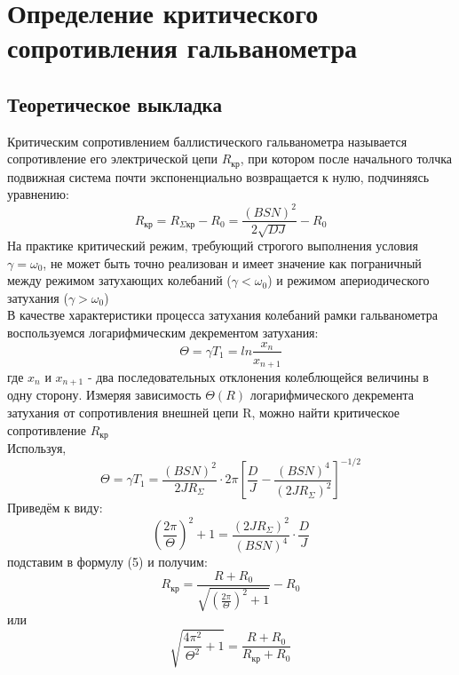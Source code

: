 \documentclass[a4paper,12pt]{article} %
\begin{document}
\section{Определение критического сопротивления гальванометра}
\subsection{Теоретическое выкладка}
Критическим сопротивлением баллистического гальванометра называется сопротивление его электрической цепи $R_\text{кр}$, при котором после начального толчка подвижная система почти экспоненциально возвращается к нулю, подчиняясь уравнению:
\begin{equation}
R_\text{кр} = R_{\Sigma\text{кр}} - R_0 = \frac{(BSN)^2}{2 \sqrt{DJ}} - R_0   
\end{equation}
На практике критический режим, требующий строгого выполнения условия $\gamma = \omega_0$, не может быть точно реализован и имеет значение как пограничный между режимом затухающих колебаний ($\gamma < \omega_0$) и режимом апериодического затухания ($\gamma > \omega_0$)
\\
В качестве характеристики процесса затухания колебаний рамки гальванометра воспользуемся логарифмическим декрементом затухания:
\begin{equation}
    \Theta = \gamma T_1 = ln\frac{x_n}{x_{n+1}}
\end{equation}
где $x_n$ и $x_{n+1}$ - два последовательных отклонения колеблющейся величины в одну сторону. Измеряя зависимость $\Theta(R)$ логарифмического декремента затухания от сопротивления внешней цепи R, можно найти 
критическое сопротивление $R_\text{кр}$
\\
Используя,
\[
\Theta = \gamma T_1 = \frac{(BSN)^2}{2 J R_\Sigma} \cdot 2\pi \left[ \frac{D}{J} - \frac{(BSN)^4}{(2JR_\Sigma)^2}\right]^{-1/2}
\]
Приведём к виду:
\[
\left(\frac{2\pi}{\Theta}\right)^2+1 = \frac{(2JR_\Sigma)^2}{(BSN)^4} \cdot \frac{D}{J}
\]
подставим в формулу (5) и получим:
\begin{equation}
    R_\text{кр} = \frac{R+R_0}{\sqrt{\left(\frac{2 \pi}{\Theta}\right)^2+1}} - R_0
\end{equation}
или
\begin{equation}
    \sqrt{\frac{4 \pi^2}{\Theta^2} + 1} = \frac{R+R_0}{R_\text{кр}+R_0}
\end{equation}
\end{document}
